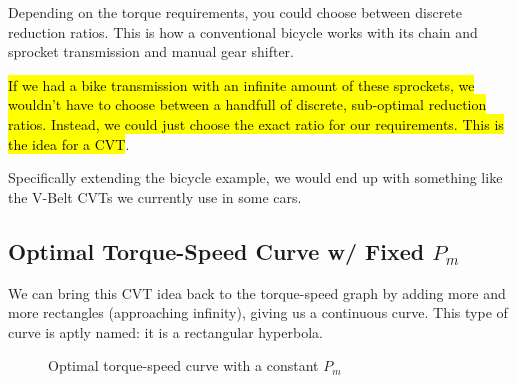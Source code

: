 \documentclass[12pt]{article}
\begin{document}
Depending on the torque requirements, you could choose between discrete reduction ratios. This is how a conventional bicycle works with its chain and sprocket transmission and manual gear shifter.

\hl{If we had a bike transmission with an infinite amount of these sprockets, we wouldn't have to choose between a handfull of discrete, sub-optimal reduction ratios. Instead, we could just choose the exact ratio for our requirements. This is the idea for a CVT}.

Specifically extending the bicycle example, we would end up with something like the V-Belt CVTs we currently use in some cars. 

\subsection{Optimal Torque-Speed Curve w/ Fixed $P_{m}$}

We can bring this CVT idea back to the torque-speed graph by adding more and more rectangles (approaching infinity), giving us a continuous curve. This type of curve is aptly named: it is a rectangular hyperbola.

\begin{figure}[H]
  \centering
    \caption{Optimal torque-speed curve with a constant $P_{m}$}\label{fig:optimal_power_curve}
\end{figure}
\end{document}

